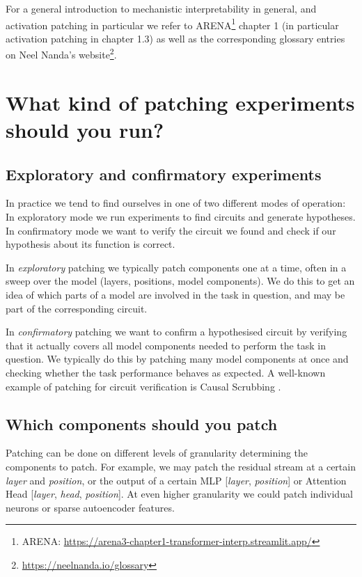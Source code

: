 \documentclass[nonatbib]{article}
\begin{document}
For a general introduction to mechanistic interpretability in general, and activation patching in particular we refer to ARENA\footnote{ARENA: \url{https://arena3-chapter1-transformer-interp.streamlit.app/}} chapter 1 (in particular activation patching in chapter 1.3) as well as the corresponding glossary entries on Neel Nanda’s website\footnote{\url{https://neelnanda.io/glossary}}.


\section{What kind of patching experiments should you run?}
\label{sec1}
\subsection{Exploratory and confirmatory experiments}
In practice we tend to find ourselves in one of two different modes of operation: In exploratory mode we run experiments to find circuits and generate hypotheses. In confirmatory mode we want to verify the circuit we found and check if our hypothesis about its function is correct.

In \textit{exploratory} patching we typically patch components one at a time, often in a sweep over the model (layers, positions, model components). We do this to get an idea of which parts of a model are involved in the task in question, and may be part of the corresponding circuit.

In \textit{confirmatory} patching we want to confirm a hypothesised circuit by verifying that it actually covers all model components needed to perform the task in question. We typically do this by patching many model components at once and checking whether the task performance behaves as expected. A well-known example of patching for circuit verification is Causal Scrubbing \citep{causal_scrubbing}.

\subsection{Which components should you patch}
Patching can be done on different levels of granularity determining the components to patch. For example, we may patch the residual stream at a certain \textit{layer} and \textit{position}, or the output of a certain MLP [\textit{layer}, \textit{position}] or Attention Head [\textit{layer}, \textit{head}, \textit{position}]. At even higher granularity we could patch individual neurons or sparse autoencoder features.
\end{document}
